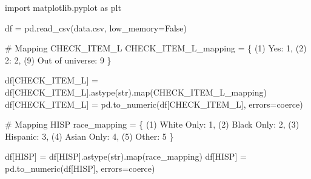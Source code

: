 \documentclass[
  letterpaper,
  DIV=11,
  numbers=noendperiod]{scrreprt}
\newenvironment{Shaded}{\begin{snugshade}}{\end{snugshade}}
\newcommand{\BuiltInTok}[1]{\textcolor[rgb]{0.00,0.23,0.31}{#1}}
\newcommand{\CommentTok}[1]{\textcolor[rgb]{0.37,0.37,0.37}{#1}}
\newcommand{\DecValTok}[1]{\textcolor[rgb]{0.68,0.00,0.00}{#1}}
\newcommand{\ImportTok}[1]{\textcolor[rgb]{0.00,0.46,0.62}{#1}}
\newcommand{\NormalTok}[1]{\textcolor[rgb]{0.00,0.23,0.31}{#1}}
\newcommand{\OperatorTok}[1]{\textcolor[rgb]{0.37,0.37,0.37}{#1}}
\newcommand{\StringTok}[1]{\textcolor[rgb]{0.13,0.47,0.30}{#1}}
\newcommand{\VariableTok}[1]{\textcolor[rgb]{0.07,0.07,0.07}{#1}}
\begin{document}
\begin{Shaded}
\begin{Highlighting}[]
\ImportTok{import}\NormalTok{ matplotlib.pyplot }\ImportTok{as}\NormalTok{ plt}

\NormalTok{df }\OperatorTok{=}\NormalTok{ pd.read\_csv(}\StringTok{\textquotesingle{}data.csv\textquotesingle{}}\NormalTok{, low\_memory}\OperatorTok{=}\VariableTok{False}\NormalTok{)}

\CommentTok{\# Mapping CHECK\_ITEM\_L}
\NormalTok{CHECK\_ITEM\_L\_mapping }\OperatorTok{=}\NormalTok{ \{}
    \StringTok{\textquotesingle{}(1) Yes\textquotesingle{}}\NormalTok{: }\DecValTok{1}\NormalTok{,}
    \StringTok{\textquotesingle{}(2) 2\textquotesingle{}}\NormalTok{: }\DecValTok{2}\NormalTok{,}
    \StringTok{\textquotesingle{}(9) Out of universe\textquotesingle{}}\NormalTok{: }\DecValTok{9}
\NormalTok{\}}

\NormalTok{df[}\StringTok{\textquotesingle{}CHECK\_ITEM\_L\textquotesingle{}}\NormalTok{] }\OperatorTok{=}\NormalTok{ df[}\StringTok{\textquotesingle{}CHECK\_ITEM\_L\textquotesingle{}}\NormalTok{].astype(}\BuiltInTok{str}\NormalTok{).}\BuiltInTok{map}\NormalTok{(CHECK\_ITEM\_L\_mapping)}
\NormalTok{df[}\StringTok{\textquotesingle{}CHECK\_ITEM\_L\textquotesingle{}}\NormalTok{] }\OperatorTok{=}\NormalTok{ pd.to\_numeric(df[}\StringTok{\textquotesingle{}CHECK\_ITEM\_L\textquotesingle{}}\NormalTok{], errors}\OperatorTok{=}\StringTok{\textquotesingle{}coerce\textquotesingle{}}\NormalTok{)}

\CommentTok{\# Mapping HISP}
\NormalTok{race\_mapping }\OperatorTok{=}\NormalTok{ \{}
    \StringTok{\textquotesingle{}(1) White Only\textquotesingle{}}\NormalTok{: }\DecValTok{1}\NormalTok{,}
    \StringTok{\textquotesingle{}(2) Black Only\textquotesingle{}}\NormalTok{: }\DecValTok{2}\NormalTok{,}
    \StringTok{\textquotesingle{}(3) Hispanic\textquotesingle{}}\NormalTok{: }\DecValTok{3}\NormalTok{,}
    \StringTok{\textquotesingle{}(4) Asian Only\textquotesingle{}}\NormalTok{: }\DecValTok{4}\NormalTok{,}
    \StringTok{\textquotesingle{}(5) Other\textquotesingle{}}\NormalTok{: }\DecValTok{5}
\NormalTok{\}}

\NormalTok{df[}\StringTok{\textquotesingle{}HISP\textquotesingle{}}\NormalTok{] }\OperatorTok{=}\NormalTok{ df[}\StringTok{\textquotesingle{}HISP\textquotesingle{}}\NormalTok{].astype(}\BuiltInTok{str}\NormalTok{).}\BuiltInTok{map}\NormalTok{(race\_mapping)}
\NormalTok{df[}\StringTok{\textquotesingle{}HISP\textquotesingle{}}\NormalTok{] }\OperatorTok{=}\NormalTok{ pd.to\_numeric(df[}\StringTok{\textquotesingle{}HISP\textquotesingle{}}\NormalTok{], errors}\OperatorTok{=}\StringTok{\textquotesingle{}coerce\textquotesingle{}}\NormalTok{)}


\end{Highlighting}
\end{Shaded}
\end{document}
